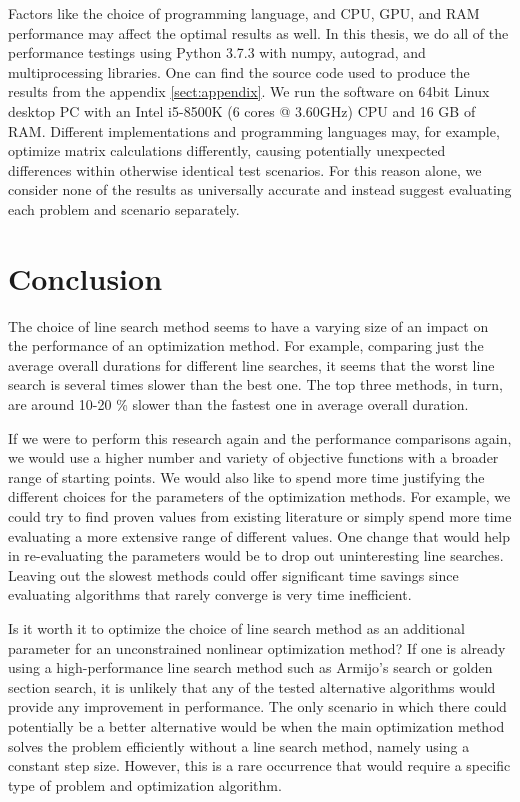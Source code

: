 \documentclass[english, 12pt, a4paper, sci, utf8, a-1b, online, table]{aaltothesis}
\begin{document}
Factors like the choice of programming language, and CPU, GPU, and RAM performance may affect the optimal results as well. In this thesis, we do all of the performance testings using Python 3.7.3 with numpy, autograd, and multiprocessing libraries. One can find the source code used to produce the results from the appendix \ref{sect:appendix}. We run the software on 64bit Linux desktop PC with an Intel i5-8500K (6 cores @ 3.60GHz) CPU and 16 GB of RAM. Different implementations and programming languages may, for example, optimize matrix calculations differently, causing potentially unexpected differences within otherwise identical test scenarios. For this reason alone, we consider none of the results as universally accurate and instead suggest evaluating each problem and scenario separately.


\section{Conclusion}
\label{sect:conclusion}


The choice of line search method seems to have a varying size of an impact on the performance of an optimization method. For example, comparing just the average overall durations for different line searches, it seems that the worst line search is several times slower than the best one. The top three methods, in turn, are around 10-20 \% slower than the fastest one in average overall duration. 

If we were to perform this research again and the performance comparisons again, we would use a higher number and variety of objective functions with a broader range of starting points. We would also like to spend more time justifying the different choices for the parameters of the optimization methods. For example, we could try to find proven values from existing literature or simply spend more time evaluating a more extensive range of different values. One change that would help in re-evaluating the parameters would be to drop out uninteresting line searches. Leaving out the slowest methods could offer significant time savings since evaluating algorithms that rarely converge is very time inefficient. 

Is it worth it to optimize the choice of line search method as an additional parameter for an unconstrained nonlinear optimization method? If one is already using a high-performance line search method such as Armijo's search or golden section search, it is unlikely that any of the tested alternative algorithms would provide any improvement in performance. The only scenario in which there could potentially be a better alternative would be when the main optimization method solves the problem efficiently without a line search method, namely using a constant step size. However, this is a rare occurrence that would require a specific type of problem and optimization algorithm.
\end{document}
